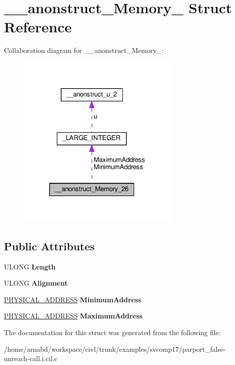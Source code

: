\hypertarget{struct____anonstruct__Memory__26}{}\section{\+\_\+\+\_\+anonstruct\+\_\+\+Memory\+\_ Struct Reference}
\label{struct____anonstruct__Memory__26}


Collaboration diagram for \+\_\+\+\_\+anonstruct\+\_\+\+Memory\+\_\+:
\nopagebreak
\begin{figure}[H]
\begin{center}
\leavevmode
\includegraphics[width=227pt]{struct____anonstruct__Memory__26__coll__graph}
\end{center}
\end{figure}
\subsection*{Public Attributes}
\begin{DoxyCompactItemize}
\item 
\hypertarget{struct____anonstruct__Memory__26_a18db678955e22aa437af52b362f081da}{}U\+L\+O\+N\+G {\bfseries Length}\label{struct____anonstruct__Memory__26_a18db678955e22aa437af52b362f081da}

\item 
\hypertarget{struct____anonstruct__Memory__26_a6fce3652c53ed1ac79da5dcd45a77e8d}{}U\+L\+O\+N\+G {\bfseries Alignment}\label{struct____anonstruct__Memory__26_a6fce3652c53ed1ac79da5dcd45a77e8d}

\item 
\hypertarget{struct____anonstruct__Memory__26_a5646176b5324a82061fb52e24cb057bc}{}\hyperlink{union__LARGE__INTEGER}{P\+H\+Y\+S\+I\+C\+A\+L\+\_\+\+A\+D\+D\+R\+E\+S\+S} {\bfseries Minimum\+Address}\label{struct____anonstruct__Memory__26_a5646176b5324a82061fb52e24cb057bc}

\item 
\hypertarget{struct____anonstruct__Memory__26_a195f59db06a2b6a5a6dc126c864d1ab2}{}\hyperlink{union__LARGE__INTEGER}{P\+H\+Y\+S\+I\+C\+A\+L\+\_\+\+A\+D\+D\+R\+E\+S\+S} {\bfseries Maximum\+Address}\label{struct____anonstruct__Memory__26_a195f59db06a2b6a5a6dc126c864d1ab2}

\end{DoxyCompactItemize}


The documentation for this struct was generated from the following file\+:\begin{DoxyCompactItemize}
\item 
/home/arnabd/workspace/civl/trunk/examples/svcomp17/parport\+\_\+false-\/unreach-\/call.\+i.\+cil.\+c\end{DoxyCompactItemize}
